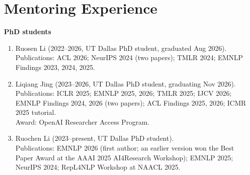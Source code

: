 \section{Mentoring Experience}

\noindent \textbf{PhD students}
\begin{enumerate}[label={},leftmargin=15pt]

\item Ruosen Li (2022--2026, UT Dallas PhD student, graduated Aug 2026). \\
Publications: ACL 2026; NeurIPS 2024 (two papers); TMLR 2024; EMNLP Findings 2023, 2024, 2025.

\vspace{0.3mm}
\item Liqiang Jing (2023--2026, UT Dallas PhD student, graduating Nov 2026). \\
Publications: ICLR 2025; EMNLP 2025, 2026; TMLR 2025; IJCV 2026; EMNLP Findings 2024, 2026 (two papers); ACL Findings 2025, 2026; ICMR 2025 tutorial. \\
Award: OpenAI Researcher Access Program.

\vspace{0.3mm}
\item Ruochen Li (2023--present, UT Dallas PhD student). \\
Publications: EMNLP 2026 (first author; an earlier version won the Best Paper Award at the AAAI 2025 AI4Research Workshop); EMNLP 2025; NeurIPS 2024; RepL4NLP Workshop at NAACL 2025.

\end{enumerate}

